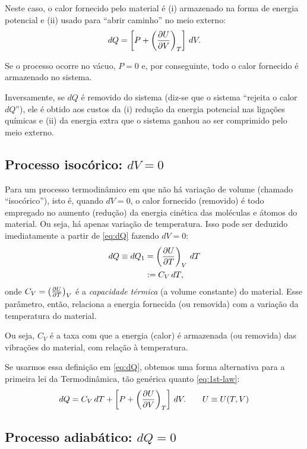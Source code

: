 \documentclass[a4paper,12pt]{scrartcl}
\begin{document}
  Neste caso, o calor fornecido pelo material é (i) armazenado na forma de energia potencial e (ii) usado para ``abrir caminho'' no meio externo:
  \begin{equation*}
  dQ = \left[P + \left(\frac{\partial U}{\partial V}\right)_{T}\right]\, dV.
  \end{equation*}
  
  Se o processo ocorre no vácuo, $P = 0$ e, por conseguinte, todo o calor fornecido é armazenado no sistema.
  
  Inversamente, se $dQ$ é removido do sistema (diz-se que o sistema ``rejeita o calor $dQ$''), ele é obtido aos custos da (i) redução da energia potencial nas ligações químicas e (ii) da energia extra que o sistema ganhou ao ser comprimido pelo meio externo.
  
  \subsection{Processo isocórico: $dV = 0$}
  
  Para um processo termodinâmico em que não há variação de volume (chamado ``isocórico''), isto é, quando $dV = 0$, o calor fornecido (removido) é todo empregado no aumento (redução) da energia cinética das moléculas e átomos do material. Ou seja, há apenas variação de temperatura. Isso pode ser deduzido imediatamente a partir de \eqref{eq:dQ} fazendo $dV = 0$:
  \begin{align*}
  dQ \equiv dQ_1 &= \left(\frac{\partial U}{\partial T}\right)_{V}\, dT\\
                 &:= C_V\, dT,
  \end{align*}
  onde $C_V = \left(\frac{\partial U}{\partial T}\right)_{V}$ é a \emph{capacidade térmica} (a volume constante) do material. Esse parâmetro, então, relaciona a energia fornecida (ou removida) com a variação da temperatura do material.
  
  Ou seja, $C_V$ é a taxa com que a energia (calor) é armazenada (ou removida) das vibrações do material, com relação à temperatura.
  
  Se usarmos essa definição em \eqref{eq:dQ}, obtemos uma forma alternativa para a primeira lei da Termodinâmica, tão genérica quanto \eqref{eq:1st-law}:
  \begin{equation}
  dQ = C_V\, dT + \left[P + \left(\frac{\partial U}{\partial V}\right)_{T}\right]\, dV.\qquad U\equiv U(T,V)
  \end{equation}
  
  \subsection*{Processo adiabático: $dQ = 0$}
  
\end{document}
